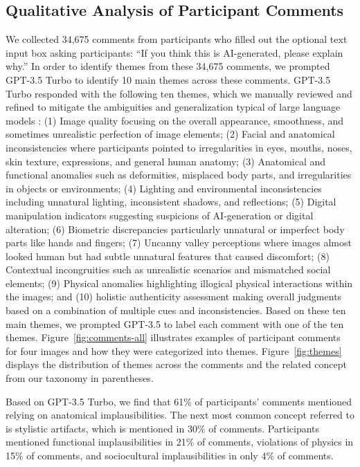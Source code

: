 \subsection{Qualitative Analysis of Participant Comments}\label{sec:qualitative-analysis}

We collected 34,675 comments from participants who filled out the optional text input box asking participants: ``If you think this is AI-generated, please explain why.'' In order to identify themes from these 34,675 comments, we prompted GPT-3.5 Turbo to identify 10 main themes across these comments. GPT-3.5 Turbo responded with the following ten themes, which we manually reviewed and refined to mitigate the ambiguities and generalization typical of large language models \cite{stephan2024rlvflearningverbalfeedback}: (1) Image quality focusing on the overall appearance, smoothness, and sometimes unrealistic perfection of image elements; (2) Facial and anatomical inconsistencies where participants pointed to irregularities in eyes, mouths, noses, skin texture, expressions, and general human anatomy; (3) Anatomical and functional anomalies such as deformities, misplaced body parts, and irregularities in objects or environments; (4) Lighting and environmental inconsistencies including unnatural lighting, inconsistent shadows, and reflections; (5) Digital manipulation indicators suggesting suspicions of AI-generation or digital alteration; (6) Biometric discrepancies particularly unnatural or imperfect body parts like hands and fingers; (7) Uncanny valley perceptions where images almost looked human but had subtle unnatural features that caused discomfort; (8) Contextual incongruities such as unrealistic scenarios and mismatched social elements; (9) Physical anomalies highlighting illogical physical interactions within the images; and (10) holistic authenticity assessment making overall judgments based on a combination of multiple cues and inconsistencies. Based on these ten main themes, we prompted GPT-3.5 to label each comment with one of the ten themes. Figure~\ref{fig:comments-all} illustrates examples of participant comments for four images and how they were categorized into themes. Figure~\ref{fig:themes} displays the distribution of themes across the comments and the related concept from our taxonomy in parentheses.

Based on GPT-3.5 Turbo, we find that 61\% of participants' comments mentioned relying on anatomical implausibilities. The next most common concept referred to is stylistic artifacts, which is mentioned in 30\% of comments. Participants mentioned functional implausibilities in 21\% of comments, violations of physics in 15\% of comments, and sociocultural implausibilities in only 4\% of comments. 

